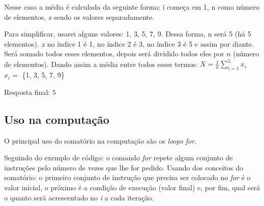 \documentclass{article}
\begin{document}
Nesse caso a média é calculada da seguinte forma: i começa em 1, n como número de elementos, \emph{x} sendo os valores separadamente.

Para simplificar, usarei alguns valores: 1, 3, 5, 7, 9. Dessa forma, n será 5 (há 5 elementos). \emph{x} no índice 1 é 1, no índice 2 é 3, no índice 3 é 5 e assim por diante. Será somado todos esses elementos, depois será dividido todos eles por $n$ (número de elementos). Dando assim a média entre todos esses termos:
\newpage
\hspace{2cm}$X = \frac{1}{n} \sum_{i=1}^{5} x_i$ \hspace{2cm} $x_i =$ \{1, 3, 5, 7, 9\}

\vspace{5mm} Resposta final: $5$


\subsection{Uso na computação}
\hspace{4mm} O principal uso do somatório na computação são os \emph{loops for}.


Seguindo do exemplo de código: o comando \emph{for} repete algum conjunto de instruções pelo número de vezes que lhe for pedido. Usando dos conceitos do somatório: o primeiro conjunto de instrução que precisa ser colocado no \emph{for} é o valor inicial, o próximo é a condição de execução (valor final) e, por fim, qual será o quanto será acrescentado no \emph{i} a cada iteração.
\end{document}
